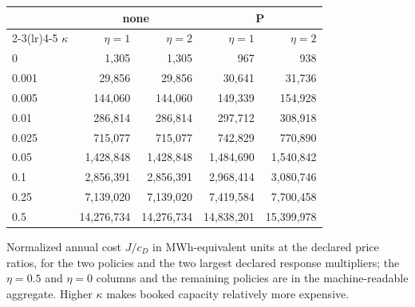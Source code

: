 {\scriptsize
\begin{tabular}{@{}lrrrr@{}}
\toprule
& \multicolumn{2}{c}{none} & \multicolumn{2}{c}{P} \\
\cmidrule(lr){2-3}\cmidrule(lr){4-5}
$\kappa$ & $\eta=1$ & $\eta=2$ & $\eta=1$ & $\eta=2$ \\
\midrule
0 & 1,305 & 1,305 & 967 & 938 \\
0.001 & 29,856 & 29,856 & 30,641 & 31,736 \\
0.005 & 144,060 & 144,060 & 149,339 & 154,928 \\
0.01 & 286,814 & 286,814 & 297,712 & 308,918 \\
0.025 & 715,077 & 715,077 & 742,829 & 770,890 \\
0.05 & 1,428,848 & 1,428,848 & 1,484,690 & 1,540,842 \\
0.1 & 2,856,391 & 2,856,391 & 2,968,414 & 3,080,746 \\
0.25 & 7,139,020 & 7,139,020 & 7,419,584 & 7,700,458 \\
0.5 & 14,276,734 & 14,276,734 & 14,838,201 & 15,399,978 \\
\bottomrule
\end{tabular}
}
\par\footnotesize Normalized annual cost $J/c_D$ in MWh-equivalent units at the declared price ratios, for the two policies and the two largest declared response multipliers; the $\eta=0.5$ and $\eta=0$ columns and the remaining policies are in the machine-readable aggregate. Higher $\kappa$ makes booked capacity relatively more expensive.
